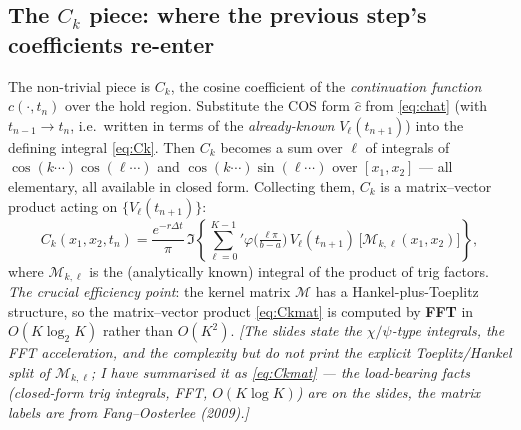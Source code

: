 \documentclass[11pt]{article}
\newcommand{\ch}{\varphi}
\begin{document}
\subsection{The $C_k$ piece: where the previous step's coefficients re-enter}
The non-trivial piece is $C_k$, the cosine coefficient of the \emph{continuation function} $c(\cdot,t_n)$ over
the hold region. Substitute the COS form $\hat c$ from \eqref{eq:chat} (with $t_{n-1}\to t_n$, i.e.\ written in
terms of the \emph{already-known} $V_\ell(t_{n+1})$) into the defining integral \eqref{eq:Ck}. Then $C_k$
becomes a sum over $\ell$ of integrals of $\cos(k\cdots)\cos(\ell\cdots)$ and $\cos(k\cdots)\sin(\ell\cdots)$
over $[x_1,x_2]$ --- all elementary, all available in closed form. Collecting them, $C_k$ is a matrix--vector
product acting on $\{V_\ell(t_{n+1})\}$:
\begin{equation}\label{eq:Ckmat}
C_k(x_1,x_2,t_n)=\frac{e^{-r\Delta t}}{\pi}\,\Im\!\left\{\sum_{\ell=0}^{K-1}{}'
\ch\!\Big(\tfrac{\ell\pi}{b-a}\Big)\,V_\ell(t_{n+1})\,
\big[\mathcal M_{k,\ell}(x_1,x_2)\big]\right\},
\end{equation}
where $\mathcal M_{k,\ell}$ is the (analytically known) integral of the product of trig factors. \emph{The
crucial efficiency point}: the kernel matrix $\mathcal M$ has a Hankel-plus-Toeplitz structure, so the
matrix--vector product \eqref{eq:Ckmat} is computed by \textbf{FFT} in $O(K\log_2 K)$ rather than $O(K^2)$.
\emph{[The slides state the $\chi/\psi$-type integrals, the FFT acceleration, and the complexity but do not
print the explicit Toeplitz/Hankel split of $\mathcal M_{k,\ell}$; I have summarised it as
\eqref{eq:Ckmat} --- the load-bearing facts (closed-form trig integrals, FFT, $O(K\log K)$) are on the slides,
the matrix labels are from Fang--Oosterlee (2009).]}
\end{document}
